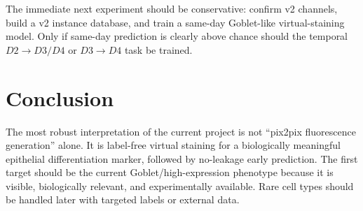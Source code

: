 \documentclass[11pt]{article}
\begin{document}
The immediate next experiment should be conservative: confirm v2 channels, build a v2 instance database, and train a same-day Goblet-like virtual-staining model. Only if same-day prediction is clearly above chance should the temporal \(D2\rightarrow D3/D4\) or \(D3\rightarrow D4\) task be trained.

\section{Conclusion}
The most robust interpretation of the current project is not ``pix2pix fluorescence generation'' alone. It is label-free virtual staining for a biologically meaningful epithelial differentiation marker, followed by no-leakage early prediction. The first target should be the current Goblet/high-expression phenotype because it is visible, biologically relevant, and experimentally available. Rare cell types should be handled later with targeted labels or external data.
\end{document}
